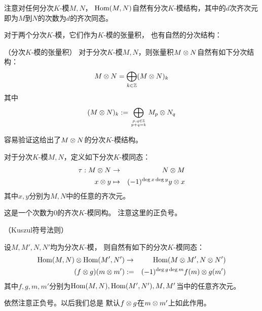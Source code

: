 注意对任何分次$K$-模$M,N$，
$\operatorname{Hom}(M,N)$自然有分次$K$-模结构，其中的$d$次齐次元
即为$M$到$N$的次数为$d$的齐次同态。




对于两个分次$K$-模，它们作为$K$-模的张量积，
也有自然的分次结构：

\begin{definition}（分次$K$-模的张量积）
对于分次$K$-模$M,N$，则张量积$M\otimes N$自然有如下分次结构：
$$M\otimes N=\bigoplus_{k\in\mathbb{Z}}(M\otimes N)_k$$
其中
$$(M\otimes N)_k:=\bigoplus_{p,q\in\mathbb{Z}\atop p+q=k}
                  M_p\otimes N_q$$
\end{definition}
容易验证这给出了$M\otimes N$的分次$K$-模结构。

\begin{definition}
对于分次$K$-模$M,N$，定义如下分次$K$-模同态：
\begin{eqnarray*}
\tau:M\otimes N&\to& N\otimes M\\
x\otimes y&\mapsto&(-1)^{\deg x\deg y}y\otimes x
\end{eqnarray*}
其中$x,y$分别为$M,N$中的任意的齐次元。
\end{definition}

这是一个次数为$0$的齐次$K$-模同构。
注意这里的正负号。


\begin{notation}（Kuszul符号法则）

设$M,M',N,N'$均为分次$K$-模，
则自然有如下的分次$K$-模同态：
\begin{eqnarray*}
\operatorname{Hom}(M,N)\otimes\operatorname{Hom}(M',N')&\to&\operatorname{Hom}(M\otimes M',N\otimes N')\\
(f\otimes g)(m\otimes m')&:=&(-1)^{\deg g\deg m}f(m)\otimes g(m')
\end{eqnarray*}
其中$f,g,m,m'$分别为$\operatorname{Hom}(M,N),\operatorname{Hom}(M',N'),M,M'$当中的任意齐次元。
\label{Koszul符号法则-notation}
\end{notation}

依然注意正负号。以后我们总是
默认$f\otimes g$在$m\otimes m'$上如此作用。

